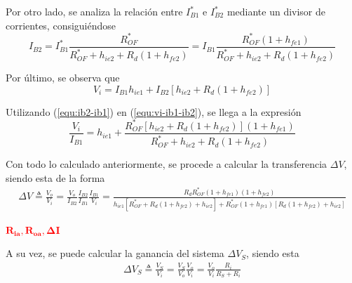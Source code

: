 Por otro lado, se analiza la relación entre $I_{B1}^*$ e $I_{B2}^*$ mediante un divisor de corrientes, consiguiéndose
\begin{equation}
	I_{B2} = I_{B1}^* \frac{R_{OF}^*}{R_{OF}^* + h_{ie2} + R_d \left( 1 + h_{fe2} \right)} = I_{B1} \frac{R_{OF}^* \left( 1 + h_{fe1} \right)}{R_{OF}^* + h_{ie2} + R_d \left( 1 + h_{fe2} \right)} 
\label{equ:ib2-ib1}
\end{equation}

Por último, se observa que
\begin{equation}
	V_i = I_{B1} h_{ie1} + I_{B2} \left[ h_{ie2} + R_d \left( 1 + h_{fe2} \right) \right]
\label{equ:vi-ib1-ib2}
\end{equation}

Utilizando (\ref{equ:ib2-ib1}) en (\ref{equ:vi-ib1-ib2}), se llega a la expresión
\begin{equation}
	\frac{V_i}{I_{B1}} =  h_{ie1} + \frac{ R_{OF}^* \left[ h_{ie2} + R_d \left( 1 + h_{fe2} \right) \right] \left( 1 + h_{fe1} \right)}{R_{OF}^* + h_{ie2} + R_d \left( 1 + h_{fe2} \right)}
\label{equ:vi-ib1}
\end{equation}

Con todo lo calculado anteriormente, se procede a calcular la transferencia $\Delta V$, siendo esta de la forma
\begin{equation}
\begin{split}
	\Delta V \triangleq \frac{V_o}{V_i} = \frac{V_o}{I_{B2}} \frac{I_{B2}}{I_{B1}} \frac{I_{B1}}{V_i} = \frac{R_d R_{OF}^* \left( 1 + h_{fe1} \right) \left( 1 + h_{fe2} \right)}{ h_{ie1} \left[ R_{OF}^* + R_d \left( 1 + h_{fe2} \right) + h_{ie2} \right] + R_{OF}^* \left( 1 + h_{fe1} \right) \left[ R_d \left( 1 + h_{fe2} \right) + h_{ie2} \right]}
\end{split}
\label{equ:v}
\end{equation}

\begin{center}
	\LARGE{\textcolor{red}{$\mathbf{R_{ia}, R_{oa}, \Delta I}$}}
\end{center}

A su vez, se puede calcular la ganancia del sistema $\Delta V_S$, siendo esta
\begin{equation}
\begin{split}
	\Delta V_S \triangleq \frac{V_S}{V_i} = \frac{V_S}{V_o} \frac{V_o}{V_i} = \frac{V_o}{V_i} \frac{R_i}{R_S + R_i}
\end{split}
\label{equ:vs}
\end{equation}
 

